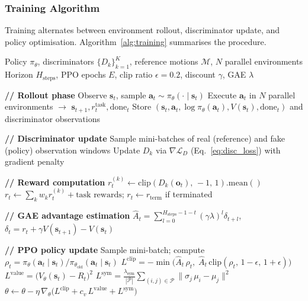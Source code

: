 \subsubsection{Training Algorithm}
\label{sec:training}

Training alternates between environment rollout, discriminator update, and policy optimisation. Algorithm~\ref{alg:training} summarises the procedure.

\begin{algorithm}
\caption{Adversarial Imitation Training}
\label{alg:training}
\begin{algorithmic}[1]
\Require Policy $\pi_\theta$, discriminators $\{D_k\}_{k=1}^{K}$, reference motions $\mathcal{M}$, $N$ parallel environments
\Require Horizon $H_{\mathrm{steps}}$, PPO epochs $E$, clip ratio $\epsilon = 0.2$, discount $\gamma$, GAE $\lambda$

    \State \textbf{// Rollout phase}
        \State Observe $\mathbf{s}_t$, sample $\mathbf{a}_t \sim \pi_\theta(\cdot \mid \mathbf{s}_t)$
        \State Execute $\mathbf{a}_t$ in $N$ parallel environments $\to$ $\mathbf{s}_{t+1}, r_t^{\mathrm{task}}, \mathrm{done}_t$
        \State Store $(\mathbf{s}_t, \mathbf{a}_t, \log\pi_\theta(\mathbf{a}_t), V(\mathbf{s}_t), \mathrm{done}_t)$ and discriminator observations
    \EndFor

    \State \textbf{// Discriminator update}
        \State Sample mini-batches of real (reference) and fake (policy) observation windows
        \State Update $D_k$ via $\nabla \mathcal{L}_D$ (Eq.~\ref{eq:disc_loss}) with gradient penalty
    \EndFor

    \State \textbf{// Reward computation}
        \State $r_t^{(k)} \gets \mathrm{clip}(D_k(\mathbf{o}_t),\, -1,\, 1).\mathrm{mean}()$
    \EndFor
    \State $r_t \gets \sum_k w_k r_t^{(k)} + \text{task rewards}$; \quad $r_t \gets r_{\mathrm{term}}$ if terminated

    \State \textbf{// GAE advantage estimation}
    \State $\hat{A}_t = \sum_{l=0}^{H_{\mathrm{steps}}-1-t} (\gamma\lambda)^l \delta_{t+l}$, \quad $\delta_t = r_t + \gamma V(\mathbf{s}_{t+1}) - V(\mathbf{s}_t)$

    \State \textbf{// PPO policy update}
        \State Sample mini-batch; compute $\rho_t = \pi_\theta(\mathbf{a}_t \mid \mathbf{s}_t) / \pi_{\theta_{\mathrm{old}}}(\mathbf{a}_t \mid \mathbf{s}_t)$
        \State $L^{\mathrm{clip}} = -\min\bigl(\hat{A}_t\, \rho_t,\; \hat{A}_t\, \mathrm{clip}(\rho_t,\, 1{-}\epsilon,\, 1{+}\epsilon)\bigr)$
        \State $L^{\mathrm{value}} = \bigl(V_\theta(\mathbf{s}_t) - R_t\bigr)^2$
        \State $L^{\mathrm{sym}} = \frac{\lambda_{\mathrm{sym}}}{|\mathcal{P}|}\sum_{(i,j)\in\mathcal{P}} \|\sigma_j\, \mu_i - \mu_j\|^2$ 
        \State $\theta \gets \theta - \eta\,\nabla_\theta\bigl(L^{\mathrm{clip}} + c_v\, L^{\mathrm{value}} + L^{\mathrm{sym}}\bigr)$
    \EndFor
\EndFor
\end{algorithmic}
\end{algorithm}


